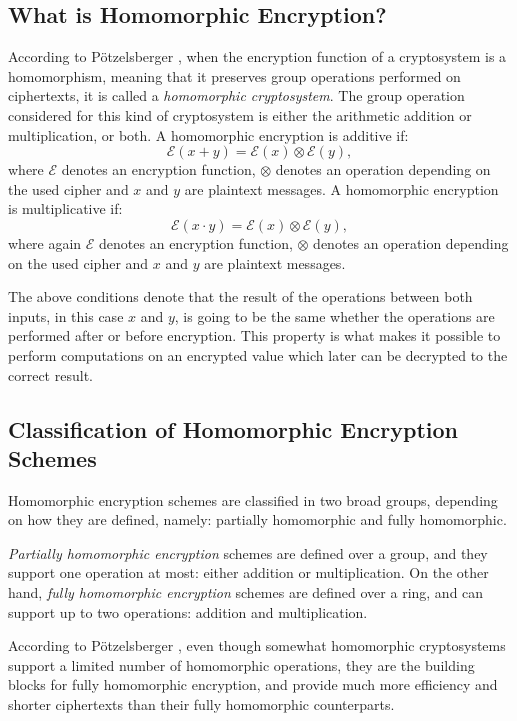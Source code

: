 \subsection{What is Homomorphic Encryption?}
According to P{\"o}tzelsberger \cite{potzelsberger2013kv}, when the encryption function of a cryptosystem is a homomorphism, meaning that it preserves group operations performed on ciphertexts, it is called a \emph{homomorphic cryptosystem}. The group operation considered for this kind of cryptosystem is either the arithmetic addition or multiplication, or both. A homomorphic encryption is additive if:
\begin{equation}
\mathcal{E}(x+y) = \mathcal{E}(x)\otimes \mathcal{E}(y),
\end{equation}
where $\mathcal{E}$ denotes an encryption function, $\otimes$ denotes an operation depending on the used cipher and $x$ and $y$ are plaintext messages. A homomorphic encryption is multiplicative if:
\begin{equation}
\mathcal{E}(x \cdot y) = \mathcal{E}(x) \otimes \mathcal{E}(y),
\end{equation}
where again $\mathcal{E}$ denotes an encryption function, $\otimes$ denotes an operation depending on the used cipher and $x$ and $y$ are plaintext messages.

The above conditions denote that the result of the operations between both inputs, in this case $x$ and $y$, is going to be the same whether the operations are performed after or before encryption. This property is what makes it possible to perform computations on an encrypted value which later can be decrypted to the correct result.

\subsection{Classification of Homomorphic Encryption Schemes}

Homomorphic encryption schemes are classified in two broad groups, depending on how they are defined, namely: partially homomorphic and fully homomorphic. 

\emph{Partially homomorphic encryption} schemes are defined over a group, and they support one operation at most: either addition or multiplication. On the other hand, \emph{fully homomorphic encryption} schemes are defined over a ring, and can support up to two operations: addition and multiplication.

According to P{\"o}tzelsberger \cite{potzelsberger2013kv}, even though somewhat homomorphic cryptosystems support a limited number of homomorphic operations, they are the building blocks for fully homomorphic encryption, and provide much more efficiency and shorter ciphertexts than their fully homomorphic counterparts. 


